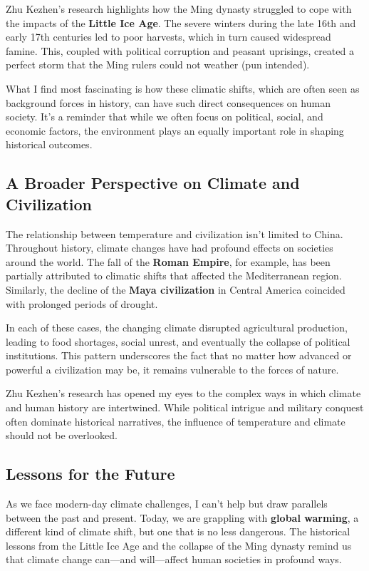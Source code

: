 \documentclass[a4paper]{article} 	%
\begin{document}
Zhu Kezhen's research highlights how the Ming dynasty struggled to cope with the impacts of the \textbf{Little Ice Age}. The severe winters during the late 16th and early 17th centuries led to poor harvests, which in turn caused widespread famine. This, coupled with political corruption and peasant uprisings, created a perfect storm that the Ming rulers could not weather (pun intended).

What I find most fascinating is how these climatic shifts, which are often seen as background forces in history, can have such direct consequences on human society. It's a reminder that while we often focus on political, social, and economic factors, the environment plays an equally important role in shaping historical outcomes.

\subsection*{A Broader Perspective on Climate and Civilization}

The relationship between temperature and civilization isn’t limited to China. Throughout history, climate changes have had profound effects on societies around the world. The fall of the \textbf{Roman Empire}, for example, has been partially attributed to climatic shifts that affected the Mediterranean region. Similarly, the decline of the \textbf{Maya civilization} in Central America coincided with prolonged periods of drought.

In each of these cases, the changing climate disrupted agricultural production, leading to food shortages, social unrest, and eventually the collapse of political institutions. This pattern underscores the fact that no matter how advanced or powerful a civilization may be, it remains vulnerable to the forces of nature.

Zhu Kezhen’s research has opened my eyes to the complex ways in which climate and human history are intertwined. While political intrigue and military conquest often dominate historical narratives, the influence of temperature and climate should not be overlooked.

\subsection*{Lessons for the Future}

As we face modern-day climate challenges, I can’t help but draw parallels between the past and present. Today, we are grappling with \textbf{global warming}, a different kind of climate shift, but one that is no less dangerous. The historical lessons from the Little Ice Age and the collapse of the Ming dynasty remind us that climate change can—and will—affect human societies in profound ways.
\end{document}
